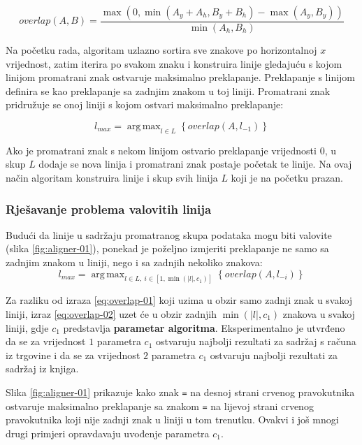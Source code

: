 \documentclass[times, utf8, zavrsni]{fer}
\DeclareMathOperator*{\argmax}{arg\,max}
\begin{document}
\begin{equation}
\label{eq:overlap}
\textit{overlap}(A, B) =
\frac{\max(0, \min( A_y + A_h, B_y + B_h ) - \max( A_y, B_y ))}{\min(A_h, B_h)}
\end{equation}

Na početku rada, algoritam uzlazno sortira sve znakove po horizontalnoj $x$
vrijednost, zatim iterira po svakom znaku i konstruira linije gledajuću s kojom
linijom promatrani znak ostvaruje maksimalno preklapanje. Preklapanje s linijom
definira se kao preklapanje sa zadnjim znakom u toj liniji. Promatrani znak
pridružuje se onoj liniji s kojom ostvari maksimalno preklapanje:

\begin{equation}
\label{eq:overlap-01}
l_{max} = \argmax_{l \in L}\left\{\textit{overlap}(A, l_{-1})\right\}
\end{equation}

Ako je promatrani znak s nekom linijom ostvario preklapanje vrijednosti $0$,
u skup $L$ dodaje se nova linija i promatrani znak postaje početak te linije.
Na ovaj način algoritam konstruira linije i skup svih linija $L$ koji je na
početku prazan.


\subsubsection{Rješavanje problema valovitih linija}
Budući da linije u sadržaju promatranog skupa podataka mogu biti valovite
(slika \ref{fig:aligner-01}), ponekad je poželjno izmjeriti preklapanje ne samo
sa zadnjim znakom u liniji, nego i sa zadnjih nekoliko znakova:
\begin{equation}
\label{eq:overlap-02}
l_{max} = \argmax_{l \in L,\ i \in [1, \min(|l|, c_1)]}\left\{\textit{overlap}
(A, l_{-i})\right\}
\end{equation}

Za razliku od izraza \ref{eq:overlap-01} koji uzima u obzir samo zadnji znak u
svakoj liniji, izraz \ref{eq:overlap-02} uzet će u obzir zadnjih
$\min(|l|, c_1)$
znakova u svakoj liniji, gdje $c_1$ predstavlja \textbf{parametar algoritma}.
Eksperimentalno je utvrđeno da se za vrijednost $1$ parametra $c_1$ ostvaruju
najbolji rezultati za sadržaj s računa iz trgovine i da se za vrijednost $2$
parametra $c_1$ ostvaruju najbolji rezultati za sadržaj iz knjiga.

Slika \ref{fig:aligner-01} prikazuje kako znak \lstinline{=} na desnoj strani
crvenog pravokutnika ostvaruje maksimalno preklapanje sa znakom \lstinline{=}
na lijevoj strani crvenog pravokutnika koji nije zadnji znak u liniji u tom
trenutku. Ovakvi i još mnogi drugi primjeri opravdavaju uvođenje parametra
$c_1$.
\end{document}
